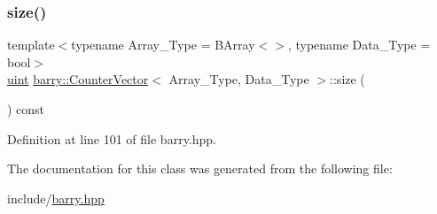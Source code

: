 \mbox{\label{classbarry_1_1_counter_vector_a05508f97e15d5a6dd2fdefb2d03060de}} 
\subsubsection{\texorpdfstring{size()}{size()}}
{\footnotesize\ttfamily template$<$typename Array\+\_\+\+Type  = B\+Array$<$$>$, typename Data\+\_\+\+Type  = bool$>$ \\
\hyperlink{namespacebarry_a11dfc53ddb4672278319aa04f1e09a6c}{uint} \hyperlink{classbarry_1_1_counter_vector}{barry\+::\+Counter\+Vector}$<$ Array\+\_\+\+Type, Data\+\_\+\+Type $>$\+::size (\begin{DoxyParamCaption}{ }\end{DoxyParamCaption}) const\hspace{0.3cm}{\ttfamily [inline]}}



Definition at line 101 of file barry.\+hpp.



The documentation for this class was generated from the following file\+:\begin{DoxyCompactItemize}
\item 
include/\hyperlink{barry_8hpp}{barry.\+hpp}\end{DoxyCompactItemize}

